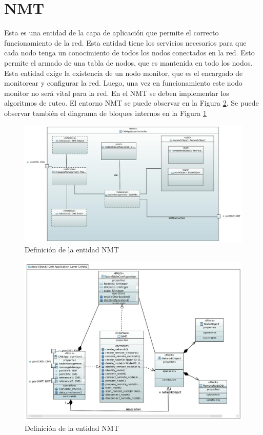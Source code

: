 \section{NMT}\label{Appendix:NMT}
Esta es una entidad de la capa de aplicación que permite el correcto
funcionamiento de la red. Esta entidad tiene los servicios necesarios para que
cada nodo tenga un conocimiento de todos los nodos conectados en la red. Esto
permite el armado de una tabla de nodos, que es mantenida en todo los
nodos. Esta entidad exige la existencia de un nodo monitor, que es el encargado
de monitorear y configurar la red. Luego, una vez en funcionamiento este nodo
monitor no será vital para la red. En el NMT se deben implementar los
algoritmos de ruteo. El entorno NMT se puede observar en la Figura
\ref{fig:NMT}. Se puede observar también el diagrama de bloques internos en
la Figura \ref{fig:NMTInterno}

\begin{figure}[h!]
 \centering
 \includegraphics[scale=0.4]{images/Secciones/AppendixA/CANae_Application_Layer_Controller.JPG}
  \caption{Definición de la entidad NMT}
\label{fig:NMTInterno}
\end{figure} 

\begin{figure}[h!]
 \centering
 \includegraphics[scale=0.4]{images/Secciones/AppendixA/NMT.JPG}
  \caption{Definición de la entidad NMT}
\label{fig:NMT}
\end{figure} 

